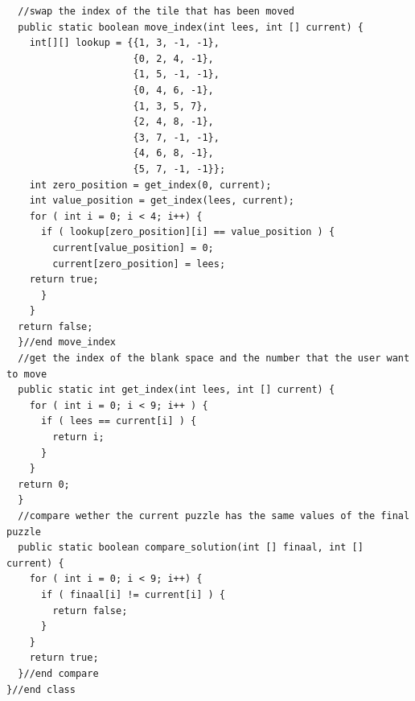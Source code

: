 \documentclass[10pt]{article}
\begin{document}
\begin{tiny}
\begin{verbatim}
  //swap the index of the tile that has been moved
  public static boolean move_index(int lees, int [] current) {
    int[][] lookup = {{1, 3, -1, -1},
                      {0, 2, 4, -1},
                      {1, 5, -1, -1},
                      {0, 4, 6, -1},
                      {1, 3, 5, 7},
                      {2, 4, 8, -1},
                      {3, 7, -1, -1},
                      {4, 6, 8, -1},
                      {5, 7, -1, -1}};
    int zero_position = get_index(0, current);
    int value_position = get_index(lees, current);
    for ( int i = 0; i < 4; i++) {
      if ( lookup[zero_position][i] == value_position ) {
        current[value_position] = 0;
        current[zero_position] = lees;
    return true;
      }
    }
  return false;
  }//end move_index
  //get the index of the blank space and the number that the user want to move
  public static int get_index(int lees, int [] current) {
    for ( int i = 0; i < 9; i++ ) {
      if ( lees == current[i] ) {
        return i;
      }
    }
  return 0;
  }
  //compare wether the current puzzle has the same values of the final puzzle
  public static boolean compare_solution(int [] finaal, int [] current) {
    for ( int i = 0; i < 9; i++) {
      if ( finaal[i] != current[i] ) {
        return false;
      }
    }
    return true;
  }//end compare
}//end class
  \end{verbatim}
   \end{tiny}
\end{document}
